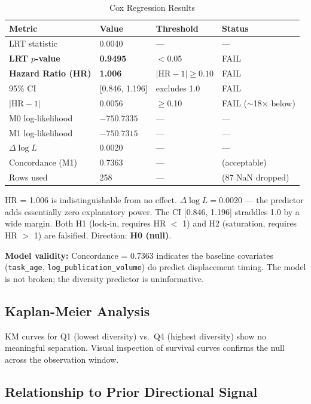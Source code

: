 \begin{table}[h]
\centering
\caption{Cox Regression Results}
\label{tab:cox_results}
\begin{tabular}{@{}llll@{}}
\toprule
Metric & Value & Threshold & Status \\
\midrule
LRT statistic & 0.0040 & --- & --- \\
\textbf{LRT $p$-value} & \textbf{0.9495} & $<$0.05 & FAIL \\
\textbf{Hazard Ratio (HR)} & \textbf{1.006} & $|\text{HR}-1| \geq 0.10$ & FAIL \\
95\% CI & [0.846, 1.196] & excludes 1.0 & FAIL \\
$|\text{HR}-1|$ & 0.0056 & $\geq$0.10 & FAIL ($\sim$18$\times$ below) \\
M0 log-likelihood & $-750.7335$ & --- & --- \\
M1 log-likelihood & $-750.7315$ & --- & --- \\
$\Delta\log L$ & 0.0020 & --- & --- \\
Concordance (M1) & 0.7363 & --- & (acceptable) \\
Rows used & 258 & --- & (87 NaN dropped) \\
\bottomrule
\end{tabular}
\end{table}

HR = 1.006 is indistinguishable from no effect. $\Delta\log L = 0.0020$ --- the predictor adds essentially zero explanatory power. The CI [0.846, 1.196] straddles 1.0 by a wide margin. Both H1 (lock-in, requires HR $<$ 1) and H2 (saturation, requires HR $>$ 1) are falsified. Direction: \textbf{H0 (null)}.

\textbf{Model validity:} Concordance = 0.7363 indicates the baseline covariates (\texttt{task\_age}, \texttt{log\_publication\_volume}) do predict displacement timing. The model is not broken; the diversity predictor is uninformative.

\subsection{Kaplan-Meier Analysis}

KM curves for Q1 (lowest diversity) vs.\ Q4 (highest diversity) show no meaningful separation. Visual inspection of survival curves confirms the null across the observation window.

\subsection{Relationship to Prior Directional Signal}
\label{sec:prior}

